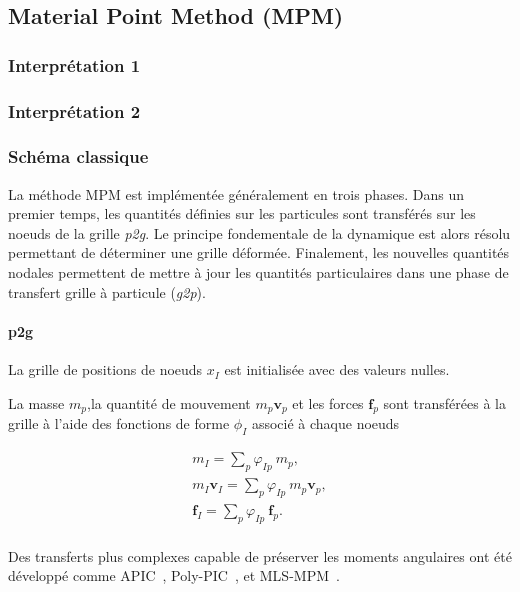 
\subsection{Material Point Method (MPM)}

\subsubsection{Interprétation 1}

\subsubsection{Interprétation 2}

\subsubsection{Schéma classique}

La méthode MPM est implémentée généralement en trois phases. Dans un premier temps, les quantités définies sur les particules sont transférés sur les noeuds de la grille \textit{p2g}. Le principe fondementale de la dynamique est alors résolu permettant de déterminer une grille déformée. Finalement, les nouvelles quantités nodales permettent de mettre à jour les quantités particulaires dans une phase de transfert grille à particule (\textit{g2p}).

\paragraph*{p2g}

La grille de positions de noeuds $x_I$ est initialisée avec des valeurs nulles.

La masse $m_p$,la quantité de mouvement $m_p \bm v_p$ et les forces $\bm f_p$ sont transférées à la grille à l'aide des fonctions de forme $\phi_I$ associé à chaque noeuds

\begin{eqnarray*}
    m_I = \sum_p \varphi_{Ip}~ m_p, \\
    m_I \bm v_I  =  \sum_p \varphi_{Ip}~ m_p \bm v_p, \\
    \bm f_I  =  \sum_p \varphi_{Ip}~  \bm f_p. \\
\end{eqnarray*}

Des transferts plus complexes capable de préserver les moments angulaires ont été développé comme APIC~\cite{jiang_affine_2015}, Poly-PIC~\cite{fu_polynomial_2017}, et MLS-MPM~\cite{hu_moving_2018}.


